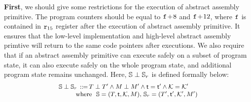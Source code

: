 \textbf{First}, we should give some restrictions 
for the execution of abstract assembly primitive. 
The program counters should be equal to 
$\texttt{f}_{}\!+\!8$ and $\texttt{f}_{}\!+\!12$, where $\texttt{f}_{}$ 
is contained in $\texttt{r}_{15}$ register after the execution 
of abstract assembly primitive.  
It ensures that the low-level implementation 
and high-level abstract assembly primtive will return to 
the same code pointers after executions. 
We also require that 
if an abstract assembly primitive 
can execute safely on a subset of program state, 
it can also execute safely on the whole program state, 
and additional program state remains unchanged.  
Here, $\mathbb{S}\perp\mathbb{S}_r$ is defined formally 
below: 
\[
    \small
    \begin{array}{l}
        \mathbb{S}\perp\mathbb{S}_r \, ::\!\!{=} \, 
        T\perp T' \land 
        M\perp M' \land \textsf{t} = \textsf{t}' 
        \land \mathcal{K} = \mathcal{K}' \\
        \qquad \ \  
        \text{where} \ \
        \mathbb{S} = (T, \textsf{t}, \mathcal{K}, M), \,
        \mathbb{S}_r = (T', \textsf{t}', \mathcal{K}', M')
    \end{array}
\]
